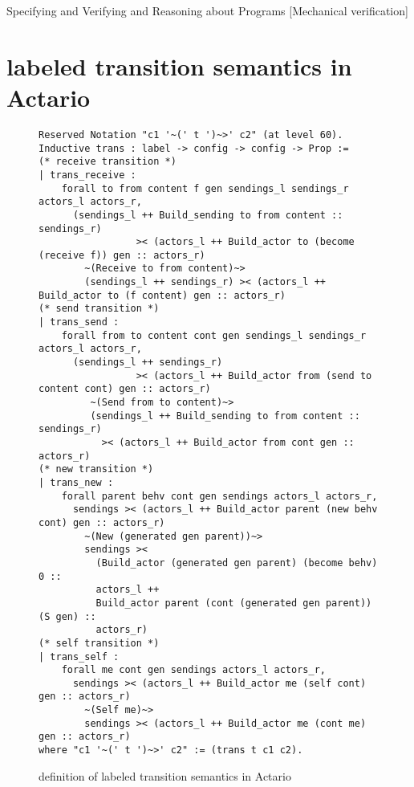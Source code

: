 \documentclass{sig-alternate}
\begin{document}
%
{Specifying and Verifying and Reasoning about Programs}%
[Mechanical verification]











%

%
%
\appendix
\section{labeled transition semantics in Actario}
\label{app:lts}
\begin{figure}[t]
\begin{lstlisting}
Reserved Notation "c1 '~(' t ')~>' c2" (at level 60).
Inductive trans : label -> config -> config -> Prop :=
(* receive transition *)
| trans_receive :
    forall to from content f gen sendings_l sendings_r actors_l actors_r,
      (sendings_l ++ Build_sending to from content :: sendings_r)
                 >< (actors_l ++ Build_actor to (become (receive f)) gen :: actors_r)
        ~(Receive to from content)~>
        (sendings_l ++ sendings_r) >< (actors_l ++ Build_actor to (f content) gen :: actors_r)
(* send transition *)
| trans_send :
    forall from to content cont gen sendings_l sendings_r actors_l actors_r,
      (sendings_l ++ sendings_r)
                 >< (actors_l ++ Build_actor from (send to content cont) gen :: actors_r)
         ~(Send from to content)~>
         (sendings_l ++ Build_sending to from content :: sendings_r)
           >< (actors_l ++ Build_actor from cont gen :: actors_r)
(* new transition *)
| trans_new :
    forall parent behv cont gen sendings actors_l actors_r,
      sendings >< (actors_l ++ Build_actor parent (new behv cont) gen :: actors_r)
        ~(New (generated gen parent))~>
        sendings ><
          (Build_actor (generated gen parent) (become behv) 0 ::
          actors_l ++
          Build_actor parent (cont (generated gen parent)) (S gen) ::
          actors_r)
(* self transition *)
| trans_self :
    forall me cont gen sendings actors_l actors_r,
      sendings >< (actors_l ++ Build_actor me (self cont) gen :: actors_r)
        ~(Self me)~>
        sendings >< (actors_l ++ Build_actor me (cont me) gen :: actors_r)
where "c1 '~(' t ')~>' c2" := (trans t c1 c2).
\end{lstlisting}
\caption{definition of labeled transition semantics in Actario}\label{fig:coq:semantics}
\end{figure}
\end{document}
